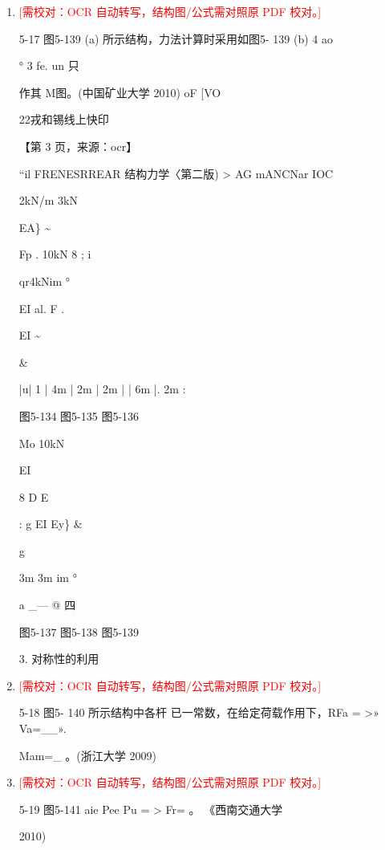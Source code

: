 \documentclass[UTF8,12pt,a4paper,openany]{ctexbook}
\newcommand{\TODO}[1]{\textcolor{red}{[需校对：#1]}}
\begin{document}
\begin{enumerate}[label=\textbf{\arabic*.},leftmargin=2em]
\item \TODO{OCR 自动转写，结构图/公式需对照原 PDF 校对。}\par 5-17 图5-139 (a) 所示结构，力法计算时采用如图5- 139 (b) 4 ao\par ° 3 fe. un  只\par 作其 M图。(中国矿业大学 2010)                                    oF [VO\par 22戎和锡线上快印\par \par 【第 3 页，来源：ocr】\par “il FRENESRREAR 结构力学〈第二版)             > AG mANCNar IOC\par 2kN/m         3kN\par EA\} \textasciitilde{}\par Fp      .                10kN     8         ;        i\par qr4kNim          °\par EI                                      al.     F    .\par EI       \textasciitilde{}\par \&\par |u|   1   |  4m  | 2m | 2m |        |    6m    |. 2m   :\par 图5-134             图5-135              图5-136\par Mo                                   10kN\par EI\par 8    D     E\par :   g   EI     Ey\} \&\par g\par 3m   3m  im           °\par a     \_—          @             四\par 图5-137          图5-138                图5-139\par 3. 对称性的利用
\item \TODO{OCR 自动转写，结构图/公式需对照原 PDF 校对。}\par 5-18 图5- 140 所示结构中各杆 已一常数，在给定荷载作用下，RFa = >» Va=\_\_».\par Mam=\_ 。(浙江大学 2009)
\item \TODO{OCR 自动转写，结构图/公式需对照原 PDF 校对。}\par 5-19 图5-141 aie Pee Pu =    > Fr=    。 《西南交通大学\par 2010)

\end{enumerate}
\end{document}
